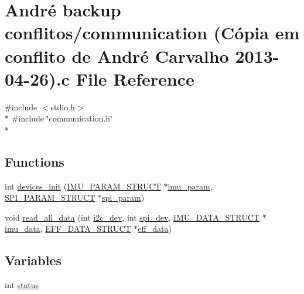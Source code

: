 \hypertarget{communication_01_07C_xC3_xB3pia_01em_01conflito_01de_01Andr_xC3_xA9_01Carvalho_012013-04-26_08_8c}{\section{André backup conflitos/communication (Cópia em conflito de André Carvalho 2013-\/04-\/26).c File Reference}
\label{communication_01_07C_xC3_xB3pia_01em_01conflito_01de_01Andr_xC3_xA9_01Carvalho_012013-04-26_08_8c}
}
{\ttfamily \#include $<$stdio.\-h$>$}\\*
{\ttfamily \#include \char`\"{}communication.\-h\char`\"{}}\\*
\subsection*{Functions}
\begin{DoxyCompactItemize}
\item 
int \hyperlink{communication_01_07C_xC3_xB3pia_01em_01conflito_01de_01Andr_xC3_xA9_01Carvalho_012013-04-26_08_8c_adfe7e60b85fe68542adde08e59151441}{devices\-\_\-init} (\hyperlink{structIMU__PARAM__STRUCT}{I\-M\-U\-\_\-\-P\-A\-R\-A\-M\-\_\-\-S\-T\-R\-U\-C\-T} $\ast$\hyperlink{main2_8c_a9c6b2109fb9402446f92995db60951b5}{imu\-\_\-param}, \hyperlink{structSPI__PARAM__STRUCT}{S\-P\-I\-\_\-\-P\-A\-R\-A\-M\-\_\-\-S\-T\-R\-U\-C\-T} $\ast$\hyperlink{main2_8c_adec2468b88cf50b20e5cf399a3b7e994}{spi\-\_\-param})
\item 
void \hyperlink{communication_01_07C_xC3_xB3pia_01em_01conflito_01de_01Andr_xC3_xA9_01Carvalho_012013-04-26_08_8c_a577b5eb591b20e011d86397f2c6f3a53}{read\-\_\-all\-\_\-data} (int \hyperlink{CommunicationV0_2communication_8c_a7751bd45ac1064efb35adf1f19c25db8}{i2c\-\_\-dev}, int \hyperlink{CommunicationV0_2communication_8c_a4788f0a5355494bc6c13690e28f43783}{spi\-\_\-dev}, \hyperlink{structIMU__DATA__STRUCT}{I\-M\-U\-\_\-\-D\-A\-T\-A\-\_\-\-S\-T\-R\-U\-C\-T} $\ast$\hyperlink{threads__linux_8c_a3cfea12cbe9ca7f1681c950e4cd68606}{imu\-\_\-data}, \hyperlink{structEFF__DATA__STRUCT}{E\-F\-F\-\_\-\-D\-A\-T\-A\-\_\-\-S\-T\-R\-U\-C\-T} $\ast$\hyperlink{main2_8c_a5650ece8c3a277c7f158d75ae65265fa}{eff\-\_\-data})
\end{DoxyCompactItemize}
\subsection*{Variables}
\begin{DoxyCompactItemize}
\item 
int \hyperlink{communication_01_07C_xC3_xB3pia_01em_01conflito_01de_01Andr_xC3_xA9_01Carvalho_012013-04-26_08_8c_a6e27f49150e9a14580fb313cc2777e00}{status}
\end{DoxyCompactItemize}


